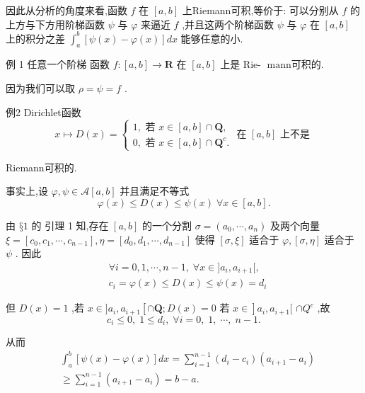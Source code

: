 因此从分析的角度来看,函数 $f$ 在 $\left\lbrack  {a,b}\right\rbrack$ 上Riemann可积,等价于: 可以分别从 $f$ 的上方与下方用阶梯函数 $\psi$ 与 $\varphi$ 来逼近 $f$ ,并且这两个阶梯函数 $\psi$ 与 $\varphi$ 在 $\left\lbrack  {a,b}\right\rbrack$ 上的积分之差 ${\int }_{a}^{b}\left\lbrack  {\psi \left( x\right)  - \varphi \left( x\right) }\right\rbrack  {dx}$ 能够任意的小.

例 1 任意一个阶梯 函数 $f : \left\lbrack  {a,b}\right\rbrack   \rightarrow  \mathbf{R}$ 在 $\left\lbrack  {a,b}\right\rbrack$ 上是 Rie- $\operatorname{mann可积的.}$

因为我们可以取 $\rho  = \psi  = f$ .

例2 Dirichlet函数
$$x \mapsto  D\left( x\right)  = \left\{  \begin{array}{l} 1,\text{ 若 }x \in  \left\lbrack  {a,b}\right\rbrack   \cap  \mathbf{Q}, \\  0,\text{ 若 }x \in  \left\lbrack  {a,b}\right\rbrack   \cap  {\mathbf{Q}}^{c}. \end{array}\right. \text{ 在 }\left\lbrack  {a,b}\right\rbrack  \text{ 上不是 }$$

Riemann可积的.

事实上,设 $\varphi ,\psi  \in  \mathcal{A}\left\lbrack  {a,b}\right\rbrack$ 并且满足不等式
$$\varphi \left( x\right)  \leq  D\left( x\right)  \leq  \psi \left( x\right) \;\forall x \in  \left\lbrack  {a,b}\right\rbrack  .$$

由 $§1$ 的 引理 1 知,存在 $\left\lbrack  {a,b}\right\rbrack$ 的一个分割 $\sigma  = \left( {{a}_{0},\cdots ,{a}_{n}}\right)$ 及两个向量 $\xi  = \left\lbrack  {{c}_{0},{c}_{1},\cdots ,{c}_{n - 1}}\right\rbrack  ,\eta  = \left\lbrack  {{d}_{0},{d}_{1},\cdots ,{d}_{n - 1}}\right\rbrack$ 使得 $\left\lbrack  {\sigma ,\xi }\right\rbrack$ 适合于 $\varphi ,\left\lbrack  {\sigma ,\eta }\right\rbrack$ 适合于 $\psi$ . 因此
\begin{align*}
	&\forall i = 0,1,\cdots ,n - 1,\;\forall x \in  \rbrack {a}_{i},{a}_{i + 1}\lbrack ,\\
	&{c}_{i} = \varphi \left( x\right)  \leq  D\left( x\right)  \leq  \psi \left( x\right)  = {d}_{i}
\end{align*}

但 $D\left( x\right)  = 1$ ,若 $x \in  \rbrack {a}_{i},{a}_{i + 1}\left\lbrack  {\cap \mathbf{Q};D\left( x\right)  = 0\text{ 若 }x \in  }\right\rbrack  {a}_{i},{a}_{i + 1}\lbrack$  $\cap  {Q}^{c}$ ,故
$${c}_{i} \leq  0,\;1 \leq  {d}_{i},\;\forall i = 0,\;1,\;\cdots ,\;n - 1.$$

从而
\begin{align*}
	&{\int }_{a}^{b}\left\lbrack  {\psi \left( x\right)  - \varphi \left( x\right) }\right\rbrack  {dx} = \mathop{\sum }\limits_{{i = 1}}^{{n - 1}}\left( {{d}_{i} - {c}_{i}}\right) \left( {{a}_{i + 1} - {a}_{i}}\right)\\
	&\geq  \mathop{\sum }\limits_{{i = 1}}^{{n - 1}}\left( {{a}_{i + 1} - {a}_{i}}\right)  = b - a.
\end{align*}


